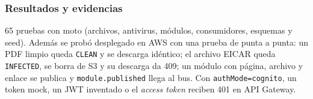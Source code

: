 \subsubsection{Resultados y evidencias}
65 pruebas con moto (archivos, antivirus, módulos, consumidores, esquemas y seed). Además se probó
desplegado en AWS con una prueba de punta a punta: un PDF limpio queda \texttt{CLEAN} y se descarga
idéntico; el archivo EICAR queda \texttt{INFECTED}, se borra de S3 y su descarga da 409; un módulo con
página, archivo y enlace se publica y \texttt{module.published} llega al bus. Con
\texttt{authMode=cognito}, un token mock, un JWT inventado o el \textit{access token} reciben 401 en API
Gateway.

